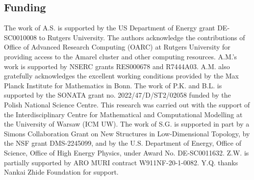 
\subsection*{Funding}

The work of A.S. is supported by the US Department of Energy grant DE-SC0010008 to Rutgers University. The authors acknowledge the contributions of Office of Advanced Research Computing (OARC) at Rutgers University for providing access to the Amarel cluster and other computing resources.
A.M.'s work is supported by NSERC grants RES000678 and R7444A03. A.M. also gratefully acknowledges the excellent working conditions provided by the Max Planck Institute for Mathematics in Bonn.
The work of P.K. and B.L. is supported by the SONATA grant no. 2022/47/D/ST2/02058 funded by the Polish National Science Centre. This research was carried out with the support of the Interdisciplinary Centre for Mathematical and Computational Modelling at the University of Warsaw (ICM UW).
The work of S.G. is supported in part by a Simons Collaboration Grant on New Structures in Low-Dimensional Topology, by the NSF grant DMS-2245099, and by the U.S. Department of Energy, Office of Science, Office of High Energy Physics, under Award No. DE-SC0011632.
Z.W. is partially supported by ARO MURI contract W911NF-20-1-0082. Y.Q. thanks Nankai Zhide Foundation for support.